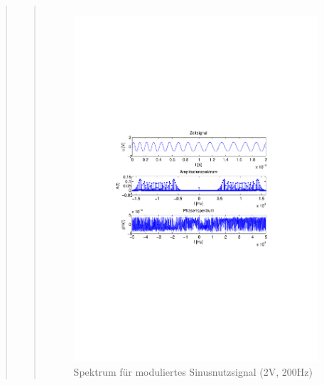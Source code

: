 \begin{quote}
\begin{quote}
\begin{center}
\begin{tabular}{ll}
            \end{tabular}
            \end{center}
            
            
             \begin{figure}[H] \centering
                    \includegraphics[scale=0.5, trim = 2cm 6.5cm 1.5cm 8.5cm,
                    clip]{./Bilder/sin_a2_f200}
                        \caption{Spektrum für moduliertes Sinusnutzsignal (2V,
                        200Hz)}
                \end{figure}
            

\end{quote}
\end{quote}
